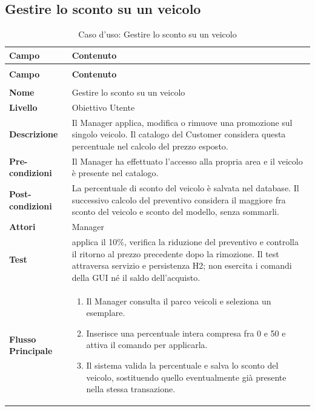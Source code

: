 \subsection{Gestire lo sconto su un veicolo}\label{sec:uc-sconto}
\begin{xltabular}{\textwidth}{| >{\bfseries}p{.22\textwidth} | >{\raggedright\arraybackslash}X |}
\caption{Caso d'uso: Gestire lo sconto su un veicolo}\label{tab:uc-sconto}\\
\hline
{} Campo & \textbf{Contenuto}\\\hline
\endfirsthead
{}\\
\hline
{} Campo & \textbf{Contenuto}\\\hline
\endhead
\hline
{}\\
\endfoot
\endlastfoot
Nome & Gestire lo sconto su un veicolo\\\hline
Livello & Obiettivo Utente\\\hline
Descrizione & Il Manager applica, modifica o rimuove una promozione sul singolo veicolo. Il catalogo del Customer considera questa percentuale nel calcolo del prezzo esposto.\\\hline
Pre-condizioni & Il Manager ha effettuato l'accesso alla propria area e il veicolo è presente nel catalogo.\\\hline
Post-condizioni & La percentuale di sconto del veicolo è salvata nel database. Il successivo calcolo del preventivo considera il maggiore fra sconto del veicolo e sconto del modello, senza sommarli.\\\hline
Attori & Manager\\\hline
Test &  applica il 10\%, verifica la riduzione del preventivo e controlla il ritorno al prezzo precedente dopo la rimozione. Il test attraversa servizio e persistenza H2; non esercita i comandi della GUI né il saldo dell'acquisto.\\\hline
Flusso Principale &
\begin{enumerate}[label=\arabic*.,start=1,leftmargin=*,nosep]
  \item Il Manager consulta il parco veicoli e seleziona un esemplare.
  \item Inserisce una percentuale intera compresa fra 0 e 50 e attiva il comando per applicarla.
  \item Il sistema valida la percentuale e salva lo sconto del veicolo, sostituendo quello eventualmente già presente nella stessa transazione.

\end{enumerate}
\end{xltabular}
